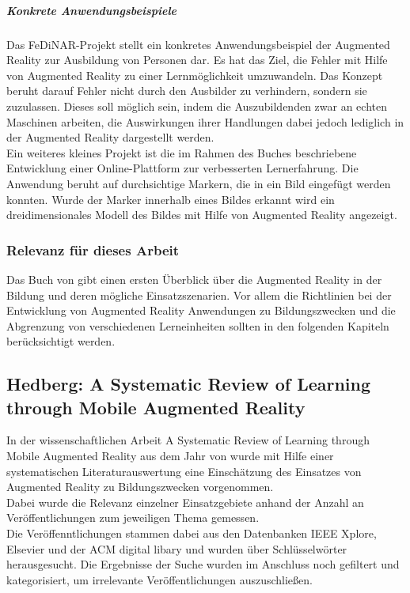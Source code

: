 \subparagraph{Konkrete Anwendungsbeispiele}
Das FeDiNAR-Projekt stellt ein konkretes Anwendungsbeispiel der Augmented Reality zur Ausbildung von Personen dar. Es hat das Ziel, die Fehler mit Hilfe von Augmented Reality zu einer Lernmöglichkeit umzuwandeln. Das Konzept beruht darauf Fehler nicht durch den Ausbilder zu verhindern, sondern sie zuzulassen. Dieses soll möglich sein, indem die Auszubildenden zwar an echten Maschinen arbeiten, die Auswirkungen ihrer Handlungen dabei jedoch lediglich in der Augmented Reality dargestellt werden. 
\citep[Kapitel 5]{geroimenko:ar-in-education}\\
Ein weiteres kleines Projekt ist die im Rahmen des Buches beschriebene Entwicklung einer Online-Plattform zur verbesserten Lernerfahrung. Die Anwendung beruht auf \glqq durchsichtige\grqq{} Markern, die in ein Bild eingefügt werden konnten. Wurde der Marker innerhalb eines Bildes erkannt wird ein dreidimensionales Modell des Bildes mit Hilfe von Augmented Reality angezeigt. \citep[Kapitel 3]{geroimenko:ar-in-education}

\subsubsection{Relevanz für dieses Arbeit}
Das Buch von \citeauthor{geroimenko:ar-in-education} gibt einen ersten Überblick über die Augmented Reality in der Bildung und deren mögliche Einsatzszenarien. Vor allem die Richtlinien bei der Entwicklung von Augmented Reality Anwendungen zu Bildungszwecken und die Abgrenzung von verschiedenen Lerneinheiten sollten in den folgenden Kapiteln berücksichtigt werden.  


\subsection{Hedberg: A Systematic Review of Learning through Mobile Augmented Reality}\label{sec:hedberg-review}
In der wissenschaftlichen Arbeit \glqq A Systematic Review of Learning through Mobile Augmented Reality\grqq{} aus dem Jahr \citeyear{hedberg:review-ar-learning} von \citeauthor{hedberg:review-ar-learning} wurde mit Hilfe einer systematischen Literaturauswertung eine Einschätzung des Einsatzes von Augmented Reality zu Bildungszwecken vorgenommen. \\
Dabei wurde die Relevanz einzelner Einsatzgebiete anhand der Anzahl an Veröffentlichungen zum jeweiligen Thema gemessen.\\ Die Veröffenntlichungen stammen dabei aus den Datenbanken \glqq IEEE Xplore\grqq , \glqq Elsevier\grqq{} und der \glqq ACM digital libary\grqq{} und wurden über Schlüsselwörter herausgesucht. Die Ergebnisse der Suche wurden im Anschluss noch gefiltert und kategorisiert, um irrelevante Veröffentlichungen auszuschließen.

